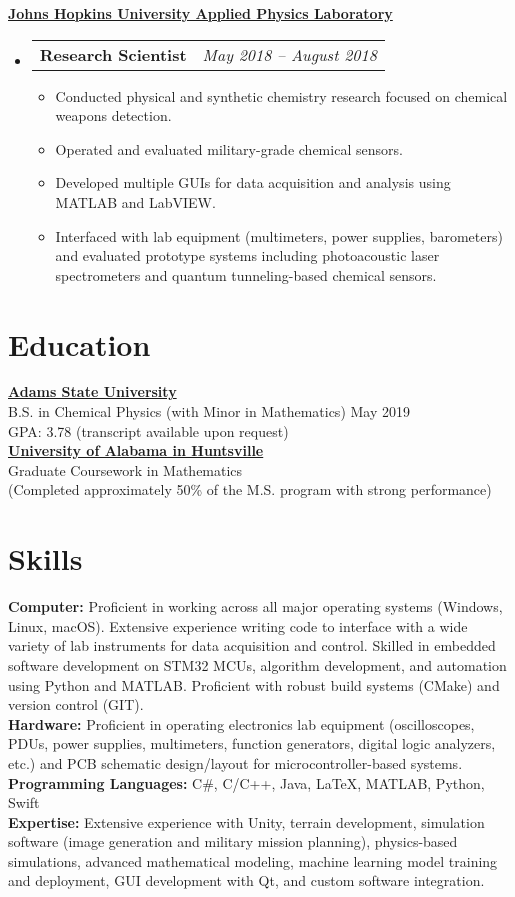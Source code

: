 \documentclass[letterpaper,11pt]{article}
\makeatletter
\newcommand{\resumeProjectEntry}[3]{%
    \vspace{-2pt}\item%
    \begin{tabular*}{0.97\textwidth}{l@{\extracolsep{\fill}}r}%
      \textbf{#1} \quad {\small \textcolor{blue}{#2}} & \textit{#3} \\%
    \end{tabular*}\vspace{-5pt}%
}
\newcommand{\resumeSubHeadingListStart}{\begin{itemize}[leftmargin=0.15in, label={}]}
\newcommand{\resumeSubHeadingListEnd}{\end{itemize}}
\newcommand{\setParameters}{%
	\vspace{-4pt}%
	\setlength{\itemsep}{0pt}%
	\setlength{\parskip}{0pt}%
}
\makeatother
\begin{document}
\underline{\textbf{Johns Hopkins University Applied Physics Laboratory}}\\[0.1cm]
\resumeSubHeadingListStart
\resumeProjectEntry{Research Scientist}{Intern}{May 2018 -- August 2018}
  \begin{itemize}
    \setParameters
    \item Conducted physical and synthetic chemistry research focused on chemical weapons detection.
    \item Operated and evaluated military-grade chemical sensors.
    \item Developed multiple GUIs for data acquisition and analysis using MATLAB and LabVIEW.
    \item Interfaced with lab equipment (multimeters, power supplies, barometers) and evaluated prototype systems including photoacoustic laser spectrometers and quantum tunneling-based chemical sensors.
  \end{itemize}
\resumeSubHeadingListEnd

\section{\hfill\Large{Education}}
\underline{\textbf{Adams State University}} \\
B.S. in Chemical Physics (with Minor in Mathematics) \hfill May 2019 \\
GPA: 3.78 (transcript available upon request) \\[5pt]
\underline{\textbf{University of Alabama in Huntsville}} \\
Graduate Coursework in Mathematics \\
(Completed approximately 50\% of the M.S. program with strong performance) \\[5pt]

\section{\hfill\Large{Skills}}
\textbf{Computer:} Proficient in working across all major operating systems (Windows, Linux, macOS). Extensive experience writing code to interface with a wide variety of lab instruments for data acquisition and control. Skilled in embedded software development on STM32 MCUs, algorithm development, and automation using Python and MATLAB. Proficient with robust build systems (CMake) and version control (GIT). \\[4pt]
\textbf{Hardware:} Proficient in operating electronics lab equipment (oscilloscopes, PDUs, power supplies, multimeters, function generators, digital logic analyzers, etc.) and PCB schematic design/layout for microcontroller-based systems. \\[4pt]
\textbf{Programming Languages:} C\#, C/C++, Java, LaTeX, MATLAB, Python, Swift \\[4pt]
\textbf{Expertise:} Extensive experience with Unity, terrain development, simulation software (image generation and military mission planning), physics-based simulations, advanced mathematical modeling, machine learning model training and deployment, GUI development with Qt, and custom software integration.
\end{document}
